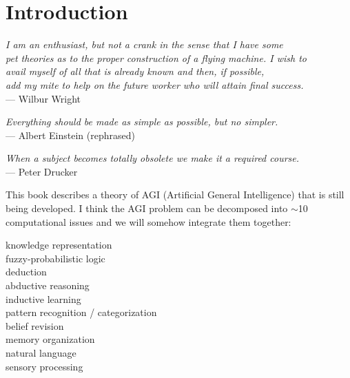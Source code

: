 \chapter{Introduction}
\begin{flushright}
\emph{I am an enthusiast, but not a crank in the sense that I have some\\
pet theories as to the proper construction of a flying machine. I wish to\\
avail myself of all that is already known and then, if possible,\\
add my mite to help on the future worker who will attain final success.}\\
--- Wilbur Wright
\end{flushright}

\begin{flushright}
\emph{Everything should be made as simple as possible, but no simpler.}\\
--- Albert Einstein (rephrased)
\end{flushright}


\begin{flushright}
\emph{When a subject becomes totally obsolete we make it a required course.}\\
--- Peter Drucker
\end{flushright}

\minitoc

This book describes a theory of AGI (Artificial General Intelligence) \citep*{Goertzel2007} that is still being developed.  I think the AGI problem can be decomposed into $\sim$10 computational issues and we will somehow integrate them together:

\leftskip 1cm
knowledge representation\\
fuzzy-probabilistic logic\\
deduction\\
abductive reasoning\\
inductive learning\\
pattern recognition / categorization\\
belief revision\\
memory organization\\
natural language\\
sensory processing

